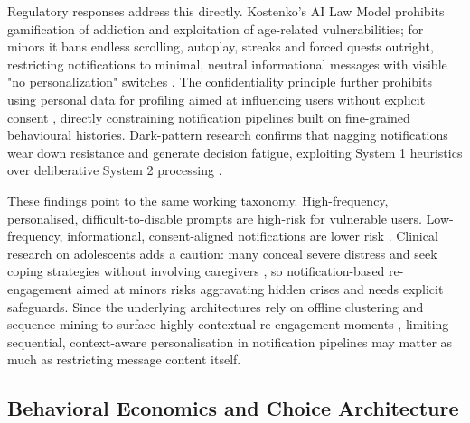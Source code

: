 \documentclass[11pt]{article}
\begin{document}
Regulatory responses address this directly. Kostenko's AI Law Model prohibits gamification of addiction and exploitation of age-related vulnerabilities; for minors it bans endless scrolling, autoplay, streaks and forced quests outright, restricting notifications to minimal, neutral informational messages with visible "no personalization" switches \parencites[223]{2977039}. The confidentiality principle further prohibits using personal data for profiling aimed at influencing users without explicit consent \parencites[44]{2977039}, directly constraining notification pipelines built on fine-grained behavioural histories. Dark-pattern research confirms that nagging notifications wear down resistance and generate decision fatigue, exploiting System 1 heuristics over deliberative System 2 processing \parencites[2]{6295677}[8]{6295677}.

These findings point to the same working taxonomy. High-frequency, personalised, difficult-to-disable prompts are high-risk for vulnerable users. Low-frequency, informational, consent-aligned notifications are lower risk \parencites[2]{8958037}[3]{8958037}[2]{3303310}[223]{2977039}. Clinical research on adolescents adds a caution: many conceal severe distress and seek coping strategies without involving caregivers \parencites[9]{2750607}, so notification-based re-engagement aimed at minors risks aggravating hidden crises and needs explicit safeguards. Since the underlying architectures rely on offline clustering and sequence mining to surface highly contextual re-engagement moments \parencites[2]{7063165}, limiting sequential, context-aware personalisation in notification pipelines may matter as much as restricting message content itself.

\subsection{Behavioral Economics and Choice Architecture}
\end{document}
